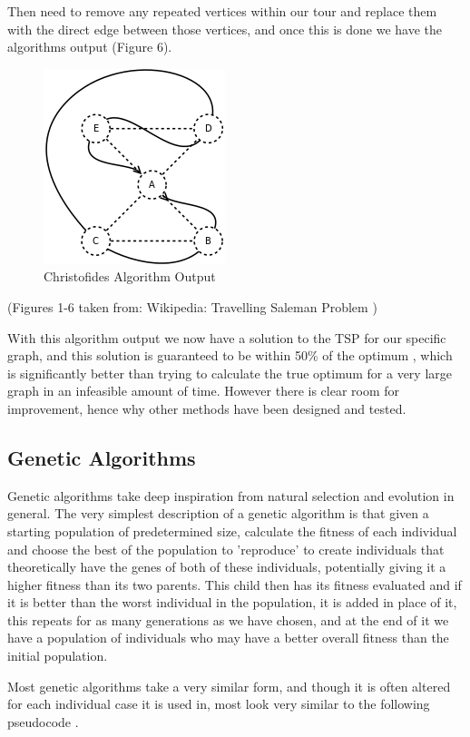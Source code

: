 \documentclass[11pt,a4paper,titlepage]{article}
\begin{document}
Then need to remove any repeated vertices within our tour and replace them with the direct edge between those vertices, and once this is done we have the algorithms output (Figure 6).

\begin{figure}[ht]
\includegraphics[scale=0.6]{WikiRemove}
\centering
\caption{Christofides Algorithm Output}
\end{figure}

(Figures 1-6 taken from: Wikipedia: Travelling Saleman Problem \cite{TSPWiki})

With this algorithm output we now have a solution to the TSP for our specific graph, and this solution is guaranteed to be within 50\% of the optimum \cite{ChrAlg}, which is significantly better than trying to calculate the true optimum for a very large graph in an infeasible amount of time. However there is clear room for improvement, hence why other methods have been designed and tested.

\subsection{Genetic Algorithms}
Genetic algorithms take deep inspiration from natural selection and evolution in general. The very simplest description of a genetic algorithm is that given a starting population of predetermined size, calculate the fitness of each individual and choose the best of the population to 'reproduce' to create individuals that theoretically have the genes of both of these individuals, potentially giving it a higher fitness than its two parents. This child then has its fitness evaluated and if it is better than the worst individual in the population, it is added in place of it, this repeats for as many generations as we have chosen, and at the end of it we have a population of individuals who may have a better overall fitness than the initial population.

Most genetic algorithms take a very similar form, and though it is often altered for each individual case it is used in, most look very similar to the following pseudocode \cite{GAIntro}.
\clearpage
\end{document}
